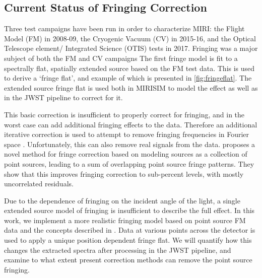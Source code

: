 \subsection{Current Status of Fringing Correction}
Three test campaigns have been run in order to characterize MIRI: the Flight Model (FM) in 2008-09, the Cryogenic Vacuum (CV) in 2015-16, and the Optical Telescope element/ Integrated Science (OTIS) tests in 2017. 
Fringing was a major subject of both the FM and CV campaigns
The first fringe model is fit to a spectrally flat, spatially extended source based on the FM test data.
This is used to derive a `fringe flat', and example of which is presented in \ref{fig:fringeflat}.
The extended source fringe flat is used both in MIRISIM to model the effect as well as in the JWST pipeline to correct for it.

This basic correction is insufficient to properly correct for fringing, and in the worst case can add additional fringing effects to the data. 
Therefore an additional iterative correction is used to attempt to remove fringing frequencies in Fourier space \parencite{Lahuis2003,Lahuis2018}.
Unfortunately, this can also remove real signals from the data.
\parencite{Argyriou2020} proposes a novel method for fringe correction based on modeling sources as a collection of point sources, leading to a sum of overlapping point source fringe patterns.
They show that this improves fringing correction to sub-percent levels, with mostly uncorrelated residuals.

Due to the dependence of fringing on the incident angle of the light, a single extended source model of fringing is insufficient to describe the full effect. 
In this work, we implement a more realistic fringing model based on point source FM data and the concepts described in \parencite{Argyriou2018a}. 
Data at various points across the detector is used to apply a unique position dependent fringe flat.
We  will quantify how this changes the extracted spectra after processing in the JWST pipeline, and examine to what extent present correction methods can remove the point source fringing.


